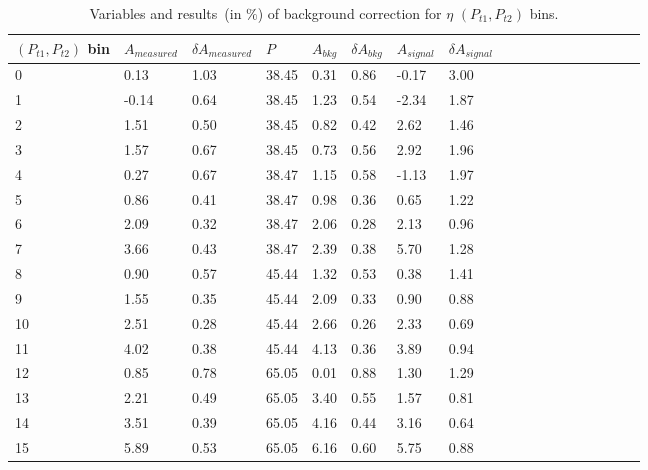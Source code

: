 \begin{table}[H]\footnotesize
\centering
\begin{tabular}{|l|l|l|l|l|l|l|l|l|l|l|l|l|l|l|l|l|l|}
\\ \hline
$(P_{t1},P_{t2})$ bin & $A_{measured}$ & $\delta A_{measured}$ & $P$ & $A_{bkg}$ & $\delta A_{bkg}$ & $A_{signal}$ & $\delta A_{signal}$ \\ \hline
0 & 0.13 & 1.03 & 38.45 & 0.31 & 0.86 & -0.17  & 3.00 \\ \hline 
1 & -0.14 & 0.64 & 38.45 & 1.23 & 0.54 & -2.34  & 1.87 \\ \hline 
2 & 1.51 & 0.50 & 38.45 & 0.82 & 0.42 & 2.62 & 1.46 \\ \hline 
3 & 1.57 & 0.67 & 38.45 & 0.73 & 0.56 & 2.92  & 1.96 \\ \hline 
4 & 0.27 & 0.67 & 38.47 & 1.15 & 0.58 & -1.13 & 1.97 \\ \hline 
5 & 0.86 & 0.41 & 38.47 & 0.98 & 0.36 & 0.65 & 1.22 \\ \hline 
6 & 2.09 & 0.32 & 38.47 & 2.06 & 0.28 & 2.13 & 0.96 \\ \hline 
7 & 3.66 & 0.43 & 38.47 & 2.39 & 0.38 & 5.70  & 1.28 \\ \hline 
8 & 0.90 & 0.57 & 45.44 & 1.32 & 0.53 & 0.38  & 1.41 \\ \hline 
9 & 1.55 & 0.35 & 45.44 & 2.09 & 0.33 & 0.90  & 0.88 \\ \hline 
10 & 2.51 & 0.28 & 45.44 & 2.66 & 0.26 & 2.33 & 0.69 \\ \hline 
11 & 4.02 & 0.38 & 45.44 & 4.13 & 0.36 & 3.89& 0.94 \\ \hline 
12 & 0.85 & 0.78 & 65.05 & 0.01 & 0.88 & 1.30  & 1.29 \\ \hline 
13 & 2.21 & 0.49 & 65.05 & 3.40 & 0.55 & 1.57  & 0.81 \\ \hline 
14 & 3.51 & 0.39 & 65.05 & 4.16 & 0.44 & 3.16 & 0.64 \\ \hline 
15 & 5.89 & 0.53 & 65.05 & 6.16 & 0.60 & 5.75 & 0.88 \\ \hline 
\end{tabular}
\caption{Variables and results~(in $\%$) of background correction for $\eta$ $(P_{t1},P_{t2})$ bins. }
\label{tab:etacomptbkgcor}
\end{table} 

